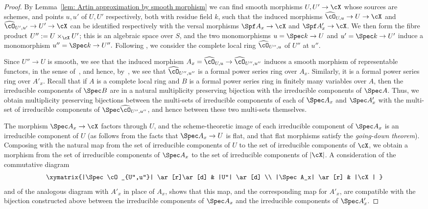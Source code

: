 \begin{proof}
By Lemma~\ref{lem: Artin approximation by smooth morphism} we can find
smooth morphisms $U,U' \to \cX$ whose sources are schemes, and  points
$u,u'$ of $U,U'$ respectively, both with
residue field $k$, such that the induced morphisms $\widehat{\cO}_{U,u}
\to U \to \cX$ and $\widehat{\cO}_{U',u'}
\to U' \to \cX$ can be identified respectively with the versal
morphisms $\Spf A_x\to\cX$ and $\Spf A'_x \to \cX$.
We then form the fibre product $U'' := U \times_{\cX} U'$; this is an algebraic
space over $S$, and the two monomorphisms $u = \Spec k \to U$
and $u' = \Spec k \to U'$ induce a monomorphism $u'' = \Spec k \to U''.$
Following \cite[Prop.~2.2.14, Def.~2.2.16]{EGstacktheoreticimages},
we consider the complete local ring $\widehat{\cO}_{U'',u}$
of $U''$ at $u''$.

Since $U'' \to U$ is smooth, we see that the induced morphism
$A_x = \widehat{\cO}_{U,u} \to \widehat{\cO}_{U'',u''}$ induces
a  smooth morphism of representable functors,
in the sense
of~\cite[\href{http://stacks.math.columbia.edu/tag/06HG}
{Def.~06HG}]{stacks-project},
and hence, by~\cite[\href{http://stacks.math.columbia.edu/tag/06HL}
{Lem.~06HL}]{stacks-project},
we see that $\widehat{\cO}_{U'',u''}$ is a formal power series
ring over $A_x$.  Similarly, it is a formal power series
ring over $A'_x$.  Recall that if
$A$ is a complete local ring and $B$ is a formal
power series ring in finitely many variables over $A$,
then the irreducible components of $\Spec B$ are in a natural multiplicity
preserving bijection with the irreducible components of $\Spec A$.
Thus, we obtain multiplicity preserving bijections
between the multi-sets of irreducible components of each
of $\Spec A_x$ and $\Spec A'_x$ with the multi-set
of irreducible components of $\Spec \widehat{\cO}_{U'',u''}$,
and hence between these two multi-sets themselves.

The morphism $\Spec A_x \to \cX$ factors through $U$,
and the scheme-theoretic image of each irreducible component 
of $\Spec A_x$ is an irreducible component of $U$ (as follows
from the facts that $\Spec A_x \to U$ is flat,
and that flat morphisms satisfy the {\em going-down theorem}).
Composing with the natural map
from the set of irreducible components of $U$ to the set
of irreducible components of $\cX$, 
we obtain a morphism from the set of irreducible components of $\Spec A_x$
to the set of irreducible components of $|\cX|$.
A consideration of the commutative diagram
$$\xymatrix{|\Spec \cO_{U'',u''}| \ar[r]\ar[d] & |U''| \ar[d] \\
|\Spec A_x| \ar[r] & |\cX| }$$
and of the analogous diagram with $A'_x$ in place of $A_x$,
shows that this map, and the corresponding map for $A'_x$,
are compatible with the bijection constructed
above between the irreducible components of $\Spec A_x$ and 
the irreducible components of $\Spec A'_x$.


\end{proof}
